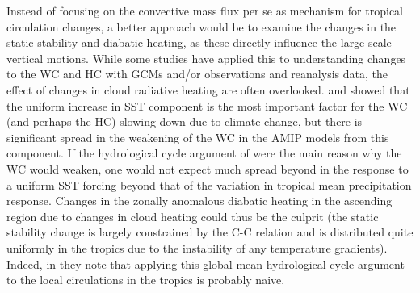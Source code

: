 \documentclass[letterpaper,12pt,titlepage,oneside,final]{book}
\begin{document}

Instead of focusing on the convective mass flux per se as mechanism for tropical circulation changes, a better approach would be to examine the changes in the static stability and diabatic heating, as these directly influence the large-scale vertical motions. While some studies have applied this to understanding changes to the WC \citep{sohn_role_2016,ma_mechanisms_2011,li_strengthening_2015} and HC \citep{mitas_recent_2006,ma_mechanisms_2011} with GCMs and/or observations and reanalysis data, the effect of changes in cloud radiative heating are often overlooked. \citep{he_anthropogenic_2015} and \citep{ma_mechanisms_2011} showed that the uniform increase in SST component is the most important factor for the WC (and perhaps the HC) slowing down due to climate change, but there is significant spread in the weakening of the WC in the AMIP models from this component. If the hydrological cycle argument of \citep{held_robust_2006} were the main reason why the WC would weaken, one would not expect much spread beyond in the response to a uniform SST forcing beyond that of the variation in tropical mean precipitation response. Changes in the zonally anomalous diabatic heating in the ascending region due to changes in cloud heating could thus be the culprit (the static stability change is largely constrained by the C-C relation and is distributed quite uniformly in the tropics due to the instability of any temperature gradients). Indeed, in \citep{schneider_water_2010} they note that applying this global mean hydrological cycle argument to the local circulations in the tropics is probably naive.
\end{document}
